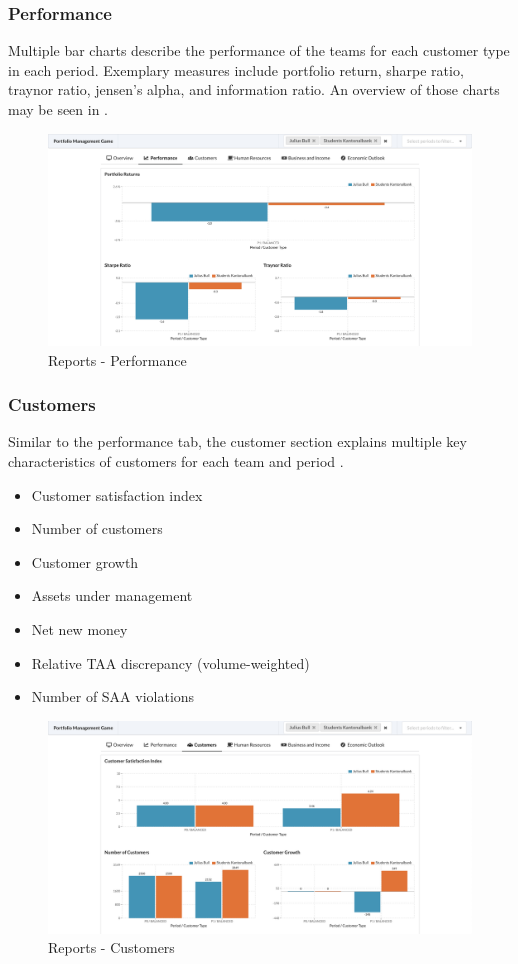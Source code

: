 \subsubsection{Performance}
Multiple bar charts describe the performance of the teams for each customer type in each period. Exemplary measures include portfolio return, sharpe ratio, traynor ratio, jensen's alpha, and information ratio. An overview of those charts may be seen in .
\begin{figure}[h!]
  \centering
  \includegraphics[scale=0.2]{img/application-overview/reports/02_performance.png}
  \caption{Reports - Performance}
  \label{fig:reports_performance}
\end{figure}

\subsubsection{Customers}
Similar to the performance tab, the customer section explains multiple key characteristics of customers for each team and period .
\begin{itemize}
  \setlength\itemsep{0.01em}
  \item Customer satisfaction index
  \item Number of customers
  \item Customer growth
  \item Assets under management
  \item Net new money
  \item Relative TAA discrepancy (volume-weighted)
  \item Number of SAA violations
\end{itemize}
\begin{figure}[h!]
  \centering
  \includegraphics[scale=0.2]{img/application-overview/reports/03_customers.png}
  \caption{Reports - Customers}
  \label{fig:reports_customers}
\end{figure}

